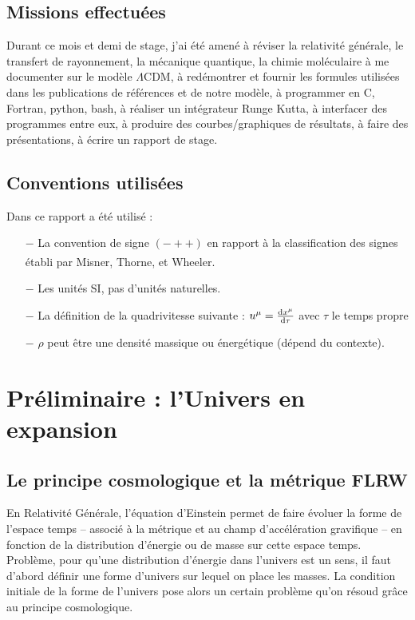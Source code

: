 \documentclass[10pt, a4paper]{report}
\numberwithin{equation}{subsection}
\begin{document}
\section*{Missions effectuées}

Durant ce mois et demi de stage, j'ai été amené à réviser la relativité générale, le transfert de rayonnement, la mécanique quantique, la chimie moléculaire à me documenter sur le modèle $\Lambda$CDM, à redémontrer et fournir les formules utilisées dans les publications de références et de notre modèle, à programmer en C, Fortran, python, bash, à réaliser un intégrateur Runge Kutta, à interfacer des programmes entre eux, à produire des courbes/graphiques de résultats, à faire des présentations, à écrire un rapport de stage.



\section*{Conventions utilisées}

Dans ce rapport a été utilisé :
\begin{itemize}
	\item[$-$] La convention de signe $(-++)$ en rapport à la classification des signes établi par Misner, Thorne, et Wheeler\textsuperscript{\cite{Signes}}.
	\item[$-$] Les unités SI, pas d'unités naturelles.
	\item[$-$] La définition de la quadrivitesse suivante : $u^\mu = \frac{{\rm d}x^\mu}{{\rm d}\tau}$ avec $\tau$ le temps propre
	\item[$-$] $\rho$ peut être une densité massique ou énergétique (dépend du contexte).
\end{itemize}



\chapter{Préliminaire : l'Univers en expansion}

\section{Le principe cosmologique et la métrique FLRW}
En Relativité Générale, l'équation d'Einstein permet de faire évoluer la forme de l'espace temps -- associé à la métrique et au champ d'accélération gravifique -- en fonction de la distribution d'énergie ou de masse sur cette espace temps. Problème, pour qu'une distribution d'énergie dans l'univers est un sens, il faut d'abord définir une forme d'univers sur lequel on place les masses. La condition initiale de la forme de l'univers pose alors un certain problème qu'on résoud grâce au principe cosmologique.
\end{document}
